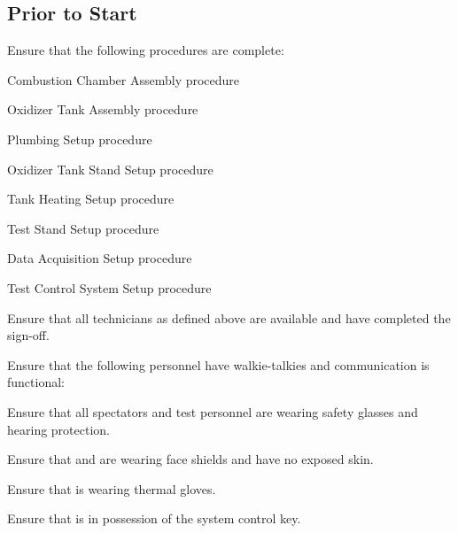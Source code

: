 \newpage
\subsection{Prior to Start}
\begin{checklist}
    \item Ensure that the following procedures are complete:
    \begin{checklist}
        \item Combustion Chamber Assembly procedure
        \item Oxidizer Tank Assembly procedure
        \item Plumbing Setup procedure
        \item Oxidizer Tank Stand Setup procedure
        \item Tank Heating Setup procedure
        \item Test Stand Setup procedure
        \item Data Acquisition Setup procedure
        \item Test Control System Setup procedure
    \end{checklist}
    \item Ensure that all technicians as defined above are available and have completed the sign-off.
    \item Ensure that the following personnel have walkie-talkies and communication is functional:
    \begin{checklist}
        \item \ops{}
        \item \primary{}
        \item \secondary{}
        \item \daq{}
        \item \heat
        \item \peri{}
        \item \perii{}
    \end{checklist}
    \item Ensure that all spectators and test personnel are wearing safety glasses and hearing protection.
    \item Ensure that \primary{} and \secondary{} are wearing face shields and have no exposed skin.
    \item Ensure that \primary{} is wearing thermal gloves.
    \item Ensure that \secondary{} is in possession of the system control key.
\end{checklist}
\setcounter{checklistnum}{0}


